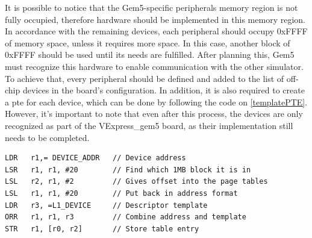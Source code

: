 It is possible to notice that the Gem5-specific peripherals memory region is not fully occupied, therefore hardware should be implemented 
in this memory region. In accordance with the remaining devices, each peripheral should occupy 0xFFFF of memory space, unless it requires
more space. In this case, another block of 0xFFFF should be used until its needs are fulfilled. After planning this, Gem5 must recognize 
this hardware to enable communication with the other simulator. 
To achieve that, every peripheral should be defined and added to the list of off-chip devices in the 
board's configuration. In addition, it is also required to create a \gls{pte} for each device, which can be done by following the
code on \ref{templatePTE}. However, it's important to note that even after this process, the devices are only recognized as part of the 
VExpress\_gem5 board, as their implementation still needs to be completed.

\hspace{1cm}

\begin{lstlisting}[style=customasm, caption={Template for a \gls{pte}}, label=templatePTE]
LDR   r1,= DEVICE_ADDR	 // Device address
LSR   r1, r1, #20        // Find which 1MB block it is in
LSL   r2, r1, #2         // Gives offset into the page tables
LSL   r1, r1, #20        // Put back in address format
LDR   r3, =L1_DEVICE     // Descriptor template
ORR   r1, r1, r3         // Combine address and template
STR   r1, [r0, r2]       // Store table entry
\end{lstlisting}


